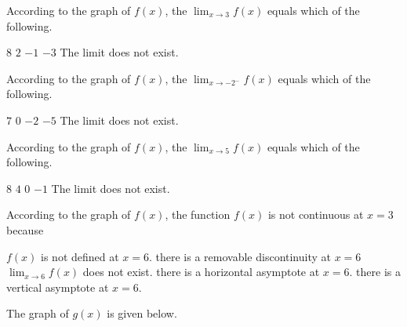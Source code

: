 \documentclass[11pt]{article}
\begin{document}
\begin{questions}
\begin{multiplechoice}{5}

\question According to the graph of $f(x)$, the $\lim_{x\to 3}f(x) $ equals which of the following.
\begin{answers}{3}
\ans $8$
\ans $2$
\ans $-1$
\ans $-3$
\ans The limit does not exist.
\end{answers}



\question According to the graph of $f(x)$, the $\lim_{x\to -2^-}f(x) $ equals which of the following.
\begin{answers}{3}
\ans $7$
\ans $0$
\ans $-2$
\ans $-5$
\ans The limit does not exist.
\end{answers}


\question According to the graph of $f(x)$, the $\lim_{x\to 5}f(x) $ equals which of the following.
\begin{answers}{3}
\ans $8$
\ans $4$
\ans $0$
\ans $-1$
\ans The limit does not exist.
\end{answers}





\question According to the graph of $f(x)$, the function $f(x)$ is not continuous at $x=3$ because
\begin{answers}{3}
\ans $f(x)$ is not defined at $x=6$.
\ans there is a removable discontinuity at $x=6$
\ans $\lim_{x\to 6}f(x)$ does not exist.
\ans there is a horizontal asymptote at $x=6$. 
\ans there is a vertical asymptote at $x=6$.
\end{answers}



\nextpage

\question The graph of $g(x)$ is given below.\\


\end{multiplechoice}
\end{questions}
\end{document}
